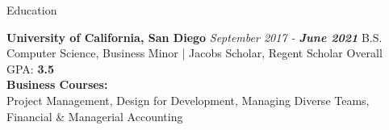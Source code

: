 \documentclass{resume} %
\begin{document}

\begin{rSection}{\faUniversity{ }}{Education}

\begin{rSubsection}{}
{\bf University of California, San Diego} {\em September 2017 - \bf{June 2021}} 
{B.S. Computer Science, Business Minor | Jacobs Scholar, Regent Scholar} { Overall GPA: \bf{3.5}}
\\ \textbf{Business Courses:}
\\Project Management, Design for Development, Managing Diverse Teams, Financial \& Managerial Accounting
\end{rSubsection}
\end{rSection}

\end{document}

